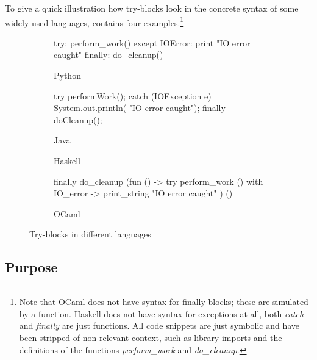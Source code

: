 To give a quick illustration how try-blocks look in the concrete syntax of some widely used
languages,  contains four examples.\footnote{Note that OCaml does not
have syntax for finally-blocks; these are simulated by a function. Haskell does not have
syntax for exceptions at all, both \emph{catch} and \emph{finally} are just functions.
All code snippets are just symbolic and have been stripped of non-relevant context, such
as library imports and the definitions of the functions \emph{perform\_work}
and \emph{do\_cleanup}.}
%
\begin{figure}
\centering
\begin{subfigure}[b]{0.46\textwidth}\begin{codepy}
try:
	perform_work()
except IOError:
	print "IO error caught"
finally:
	do_cleanup()
\end{codepy}\caption{Python}\end{subfigure}
%
\begin{subfigure}[b]{0.46\textwidth}\begin{codejava}
try {
	performWork();
} catch (IOException e) {
	System.out.println(
	    "IO error caught");
} finally {
	doCleanup();
}
\end{codejava}\caption{Java}\end{subfigure}

\begin{subfigure}[b]{0.46\textwidth}\caption{Haskell}\end{subfigure}
%
\begin{subfigure}[b]{0.46\textwidth}\begin{codeml}
finally do_cleanup (fun () ->
  try perform_work ()
  with IO_error ->
    print_string "IO error caught"
) ()
\end{codeml}\caption{OCaml}\end{subfigure}

\caption{Try-blocks in different languages}
\label{fig:try-blocks}
\end{figure}


\subsection{Purpose}

